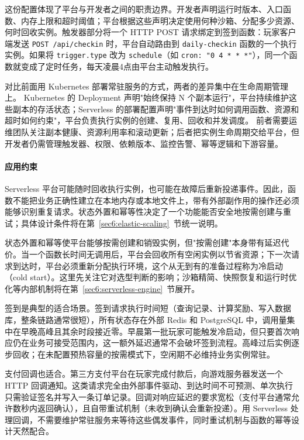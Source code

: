 这份配置体现了平台与开发者之间的职责边界。开发者声明运行时版本、入口函数、内存上限和超时阈值；平台根据这些声明决定使用何种沙箱、分配多少资源、何时回收实例。触发器部分将一个 HTTP POST 请求绑定到签到函数：玩家客户端发送 \texttt{POST /api/checkin} 时，平台自动路由到 \texttt{daily-checkin} 函数的一个执行实例。如果将 \texttt{trigger.type} 改为 \texttt{schedule}（如 \texttt{cron: "0 4 * * *"}），同一个函数就变成了定时任务，每天凌晨4点由平台主动触发执行。

对比前面用 Kubernetes 部署常驻服务的方式，两者的差异集中在生命周期管理上。
Kubernetes 的 Deployment 声明"始终保持 N 个副本运行"，平台持续维护这些副本的存活状态；Serverless 的部署配置声明"事件到达时如何调用函数、资源和超时如何约束"，平台负责执行实例的创建、复用、回收和并发调度。
前者需要运维团队关注副本健康、资源利用率和滚动更新；后者把实例生命周期交给平台，但开发者仍需管理触发器、权限、依赖版本、监控告警、幂等逻辑和下游容量。

\paragraph{应用约束}

Serverless 平台可能随时回收执行实例，也可能在故障后重新投递事件。因此，函数不能把业务正确性建立在本地内存或本地文件上，带有外部副作用的操作还必须能够识别重复请求。状态外置和幂等性决定了一个功能能否安全地按需创建与重试；具体设计条件将在第~\ref{sec6:elastic-scaling}~节统一说明。

状态外置和幂等使平台能够按需创建和销毁实例，但"按需创建"本身带有延迟代价。当一个函数长时间无调用后，平台会回收所有空闲实例以节省资源；下一次请求到达时，平台必须重新分配执行环境，这个从无到有的准备过程称为冷启动（cold start）。这里先关注它对选型判断的影响；沙箱精简、快照恢复和运行时优化等内部机制将在第~\ref{sec6:serverless-engine}~节展开。

签到是典型的适合场景。签到请求执行时间短（查询记录、计算奖励、写入数据库，整条链路通常很短），所有状态存在外部 Redis 和 PostgreSQL 中，调用量集中在早晚高峰且其余时段接近零。早晨第一批玩家可能触发冷启动，但只要首次响应仍在业务可接受范围内，这一额外延迟通常不会破坏签到流程。高峰过后实例逐步回收；在未配置预热容量的按需模式下，空闲期不必维持业务实例常驻。

支付回调也适合。第三方支付平台在玩家完成付款后，向游戏服务器发送一个 HTTP 回调通知。这类请求完全由外部事件驱动、到达时间不可预测、单次执行只需验证签名并写入一条订单记录。回调对响应延迟的要求宽松（支付平台通常允许数秒内返回确认），且自带重试机制（未收到确认会重新投递）。用 Serverless 处理回调，不需要维护常驻服务来等待这些偶发事件，同时重试机制与函数的幂等设计天然配合。

